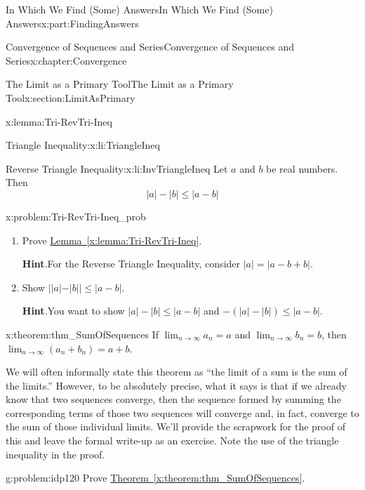 \documentclass[oneside,10pt,]{book}
\newcommand{\blocktitlefont}{\relax}
\newcommand{\xreffont}{\relax}
\numberwithin{equation}{section}
\newcommand{\abs}[1]{\left|#1\right|}
\begin{document}
\begin{partptx}{In Which We Find (Some) Answers}{}{In Which We Find (Some) Answers}{}{}{x:part:FindingAnswers}
\begin{chapterptx}{Convergence of Sequences and Series}{}{Convergence of Sequences and Series}{}{}{x:chapter:Convergence}
\begin{sectionptx}{The Limit as a Primary Tool}{}{The Limit as a Primary Tool}{}{}{x:section:LimitAsPrimary}
\begin{lemma}{}{}{x:lemma:Tri-RevTri-Ineq}
\begin{descriptionlist}
\begin{dlimedium}{Triangle Inequality:}{x:li:TriangleIneq}
%
\end{dlimedium}%
\begin{dlimedium}{Reverse Triangle Inequality:}{x:li:InvTriangleIneq}%
Let \(a\) and \(b\) be real numbers. Then%
\begin{equation*}
|a|-|b|\leq\abs{a-b} {}
\end{equation*}
%
\end{dlimedium}%
\end{descriptionlist}
%
\end{lemma}
\begin{problem}{}{x:problem:Tri-RevTri-Ineq_prob}%
\begin{enumerate}[font=\bfseries,label=(\alph*),ref=\alph*]
\item{}Prove \hyperref[x:lemma:Tri-RevTri-Ineq]{Lemma~{\xreffont\ref{x:lemma:Tri-RevTri-Ineq}}}.%
\par\smallskip%
\noindent\textbf{\blocktitlefont Hint}.\hypertarget{g:hint:idp118}{}\quad{}For the Reverse Triangle Inequality, consider \(|a|=|a-b+b|\).%
\item{}Show \(||a|-|b||\leq|a-b|\).%
\par\smallskip%
\noindent\textbf{\blocktitlefont Hint}.\hypertarget{g:hint:idp119}{}\quad{}You want to show \(|a|-|b|\leq|a-b|\) and \(-(|a|-|b|)\leq|a-b|\).%
\end{enumerate}
\end{problem}
\begin{theorem}{}{}{x:theorem:thm_SumOfSequences}%
 If \(\displaystyle\lim_{n\rightarrow\infty}a_n=a\) and \(\displaystyle\lim_{n\rightarrow\infty}b_n=b\), then \(\displaystyle\lim_{n\rightarrow\infty}\left(a_n+b_n\right)=a+b\).%
\end{theorem}
We will often informally state this theorem as ``the limit of a sum is the sum of the limits.'' However, to be absolutely precise, what it says is that if we already know that two sequences converge, then the sequence formed by summing the corresponding terms of those two sequences will converge and, in fact, converge to the sum of those individual limits. We'll provide the scrapwork for the proof of this and leave the formal write-up as an exercise. Note the use of the triangle inequality in the proof.%
\par
%
\begin{problem}{}{g:problem:idp120}%
 Prove \hyperref[x:theorem:thm_SumOfSequences]{Theorem~{\xreffont\ref{x:theorem:thm_SumOfSequences}}}.%

\end{problem}
\end{sectionptx}
\end{chapterptx}
\end{partptx}
\end{document}
